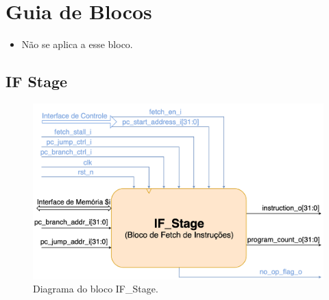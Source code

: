 \section{Guia de Blocos} %
\label{sec:guia_de_blocos}

\begin{itemize}
  \item Não se aplica a esse bloco.

\end{itemize}

\subsection{IF Stage}
\clearpage
\begin{figure}[!htb]
  \caption{Diagrama do bloco IF\_Stage.}
  \vspace{0.2cm}
  \includegraphics[width=\linewidth]{images/IF_Stage(BLOCK).png}
\end{figure}


